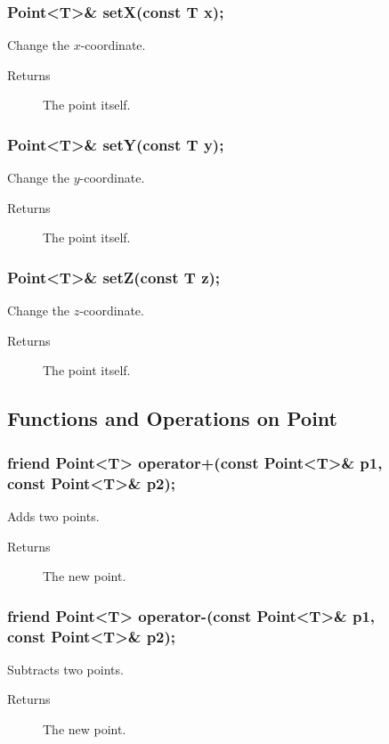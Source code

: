 \subsubsection{Point<T>\& setX(const T x);}
Change the $x$-coordinate. 
\begin{description}
  \item[Returns] The point itself.
\end{description}

\subsubsection{Point<T>\& setY(const T y);}
Change the $y$-coordinate.
\begin{description}
  \item[Returns] The point itself.
\end{description}

\subsubsection{Point<T>\& setZ(const T z);}
Change the $z$-coordinate.
\begin{description}
  \item[Returns] The point itself.
\end{description}

\subsection{Functions and Operations on Point}

\subsubsection{friend Point<T> operator+(const Point<T>\& p1, \\
                                         const Point<T>\& p2);}
Adds two points.
 
\begin{description}
  \item[Returns] The new point.
\end{description}

\subsubsection{friend Point<T> operator-(const Point<T>\& p1, \\
                                         const Point<T>\& p2);}
Subtracts two points.
\begin{description}
  \item[Returns] The new point.
\end{description}

